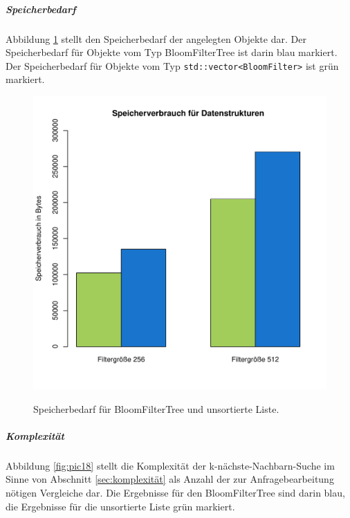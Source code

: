 \subparagraph*{Speicherbedarf}
Abbildung \ref{fig:pic17} stellt den Speicherbedarf der angelegten Objekte dar. Der Speicherbedarf für Objekte vom Typ BloomFilterTree ist darin blau markiert. Der Speicherbedarf für Objekte vom Typ \texttt{std::vector<BloomFilter>} ist grün markiert. 
\begin{figure}[hptb]
	\centering
	\includegraphics[scale=0.7]{pictures/mem.pdf}\\
	\caption[Speicherbedarf für BloomFilterTree und unsortierte Liste]{Speicherbedarf für BloomFilterTree und unsortierte Liste.}\label{fig:pic17} 
\end{figure}	
\subparagraph*{Komplexität}
Abbildung \ref{fig:pic18} stellt die Komplexität der k-nächste-Nachbarn-Suche im Sinne von Abschnitt \ref{sec:komplexität} als Anzahl der zur Anfragebearbeitung nötigen Vergleiche dar. Die Ergebnisse für den BloomFilterTree sind darin blau, die Ergebnisse für die unsortierte Liste grün markiert.
